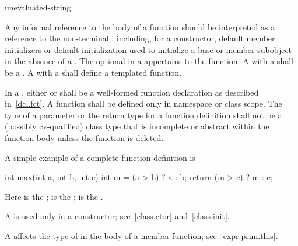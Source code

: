 \begin{bnf}
\br
    \terminal{=}  \terminal{;}\br
    \terminal{=}  \terminal{(} unevaluated-string \terminal{)} \terminal{;}
\end{bnf}

Any informal reference to the body of a function should be interpreted as a reference to
the non-terminal ,
including, for a constructor,
default member initializers or default initialization
used to initialize
a base or member subobject in the absence of
a .
The optional  in a 
appertains to the function.
A  with a 
shall be a .
A  with a 
shall define a templated function.

\pnum
In a ,
either   \tcode{;}
or  \tcode{;}
shall be a well-formed function declaration
as described in~\ref{dcl.fct}.
A function shall be defined only in namespace or class scope.
The type of a parameter or the return type for a function
definition shall not be
a (possibly cv-qualified) class type that is
incomplete or abstract within the function body
unless the function is deleted.

\pnum
\begin{example}
A simple example of a complete function definition is
\begin{codeblock}
int max(int a, int b, int c) {
  int m = (a > b) ? a : b;
  return (m > c) ? m : c;
}
\end{codeblock}

Here
is the
;
is the
;
\tcode{\{ \commentellip{} \}}
is the
.
\end{example}

\pnum
{}%
%
%
A
is used only in a constructor; see~\ref{class.ctor} and~\ref{class.init}.

\pnum
\begin{note}
A  affects the type of 
in the body of a member function; see~\ref{expr.prim.this}.
\end{note}

